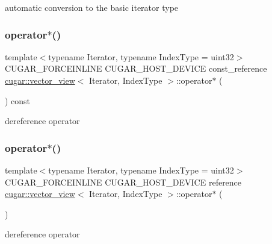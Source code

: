 automatic conversion to the basic iterator type \mbox{\label{structcugar_1_1vector__view_a446be6811de588c4ab935cf3b85b81d2}} 
\subsubsection{\texorpdfstring{operator$\ast$()}{operator*()}\hspace{0.1cm}{\footnotesize\ttfamily [1/2]}}
{\footnotesize\ttfamily template$<$typename Iterator, typename Index\+Type = uint32$>$ \\
C\+U\+G\+A\+R\+\_\+\+F\+O\+R\+C\+E\+I\+N\+L\+I\+NE C\+U\+G\+A\+R\+\_\+\+H\+O\+S\+T\+\_\+\+D\+E\+V\+I\+CE const\+\_\+reference \hyperlink{structcugar_1_1vector__view}{cugar\+::vector\+\_\+view}$<$ Iterator, Index\+Type $>$\+::operator$\ast$ (\begin{DoxyParamCaption}{ }\end{DoxyParamCaption}) const\hspace{0.3cm}{\ttfamily [inline]}}

dereference operator \mbox{\label{structcugar_1_1vector__view_a355007914d4ca4e66cdca7a16c90bf0f}} 
\subsubsection{\texorpdfstring{operator$\ast$()}{operator*()}\hspace{0.1cm}{\footnotesize\ttfamily [2/2]}}
{\footnotesize\ttfamily template$<$typename Iterator, typename Index\+Type = uint32$>$ \\
C\+U\+G\+A\+R\+\_\+\+F\+O\+R\+C\+E\+I\+N\+L\+I\+NE C\+U\+G\+A\+R\+\_\+\+H\+O\+S\+T\+\_\+\+D\+E\+V\+I\+CE reference \hyperlink{structcugar_1_1vector__view}{cugar\+::vector\+\_\+view}$<$ Iterator, Index\+Type $>$\+::operator$\ast$ (\begin{DoxyParamCaption}{ }\end{DoxyParamCaption})\hspace{0.3cm}{\ttfamily [inline]}}

dereference operator \mbox{\label{structcugar_1_1vector__view_a0fda103573e609c8c62592067806fc86}} 
